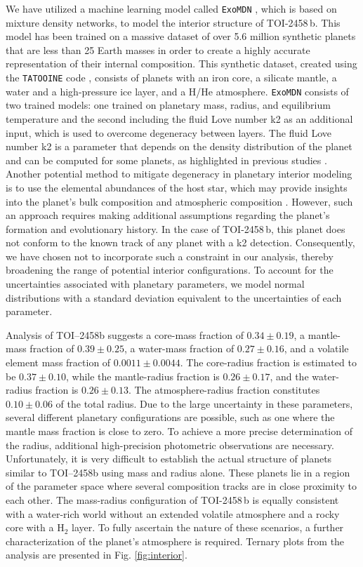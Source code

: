 \documentclass[traditabstract,longauth]{aa}
\begin{document}
We have utilized a machine learning model called {\tt ExoMDN} \citep{Baumeister23}, which is based on mixture density networks, to model the interior structure of TOI-2458\,b. This model has been trained on a massive dataset of over 5.6 million synthetic planets that are less than 25 Earth masses in order to create a highly accurate representation of their internal composition. This synthetic dataset, created using the {\tt TATOOINE} code \citep{Baumeister20,MacKenzie23}, consists of planets with an iron core, a silicate mantle, a water and a high-pressure ice layer, and a H/He atmosphere. {\tt ExoMDN} consists of two trained models: one trained on planetary mass, radius, and equilibrium temperature and the second including the fluid Love number k2 as an additional input, which is used to overcome degeneracy between layers. The fluid Love number k2 is a parameter that depends on the density distribution of the planet and can be computed for some planets, as highlighted in previous studies \citep{Csizmadia19,Akinsanmi19}. Another potential method to mitigate degeneracy in planetary interior modeling is to use the elemental abundances of the host star, which may provide insights into the planet's bulk composition and atmospheric composition \citep{Dorn15}. However, such an approach requires making additional assumptions regarding the planet's formation and evolutionary history. In the case of TOI-2458\,b, this planet does not conform to the known track of any planet with a k2 detection. Consequently, we have chosen not to incorporate such a constraint in our analysis, thereby broadening the range of potential interior configurations. To account for the uncertainties associated with planetary parameters, we model normal distributions with a standard deviation equivalent to the uncertainties of each parameter.

Analysis of TOI–2458b suggests a core-mass fraction of $0.34 \pm 0.19$, a mantle-mass fraction of $0.39 \pm 0.25$, a water-mass fraction of $0.27 \pm 0.16$, and a volatile element mass fraction of $0.0011 \pm 0.0044$. The core-radius fraction is estimated to be $0.37 \pm 0.10$, while the mantle-radius fraction is $0.26 \pm 0.17$, and the water-radius fraction is $0.26 \pm 0.13$. The atmosphere-radius fraction constitutes $0.10 \pm 0.06$ of the total radius. Due to the large uncertainty in these parameters, several different planetary configurations are possible, such as one where the mantle mass fraction is close to zero. To achieve a more precise determination of the radius, additional high-precision photometric observations are necessary. Unfortunately, it is very difficult to establish the actual structure of planets similar to TOI–2458b using mass and radius alone. These planets lie in a region of the parameter space where several composition tracks are in close proximity to each other. The mass-radius configuration of TOI-2458\,b is equally consistent with a water-rich world without an extended volatile atmosphere and a rocky core with a H$_2$ layer. To fully ascertain the nature of these scenarios, a further characterization of the planet's atmosphere is required. Ternary plots from the analysis are presented in Fig. \ref{fig:interior}.
\end{document}
